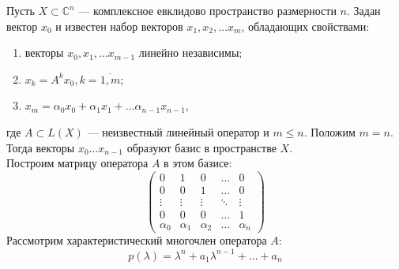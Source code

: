 
\cite{baskakov}
Пусть $X \subset \mathbb{C}^n$ --- комплексное евклидово пространство размерности $n$. 
Задан вектор $x_0$ и известен набор векторов $x_1,x_2, \dots x_m$, обладающих свойствами:
\begin{enumerate}
	\item векторы $x_0,x_1, \dots x_{m-1}$ линейно независимы;
	\item $x_k = A^k x_0, k= \overline{1,m}$;
	\item $x_m = \alpha_0 x_0 + \alpha_1 x_1 + \dots \alpha_{n-1} x_{n-1}$,
\end{enumerate}
где $A \subset L(X)$ --- неизвестный  линейный оператор и $m \leqslant n$. Положим $m=n$. 
Тогда векторы $x_0 \dots x_{n-1}$ образуют базис в пространстве $X$. \\

Построим матрицу оператора $A$ в этом базисе:
\[
	\begin{pmatrix}
		0 & 1 & 0 & \dots & 0 \\
		0 & 0 & 1 & \dots & 0 \\
		\vdots & \vdots & \vdots & \ddots & \vdots \\
		0 & 0 & 0 & \dots & 1 \\
		\alpha_0 & \alpha_1 & \alpha_2 & \dots & \alpha_n
	\end{pmatrix}
\]
Рассмотрим характеристический многочлен оператора $A$:
\[
	p(\lambda) = \lambda^n+a_1 \lambda^{n-1} + \dots + a_n
\]